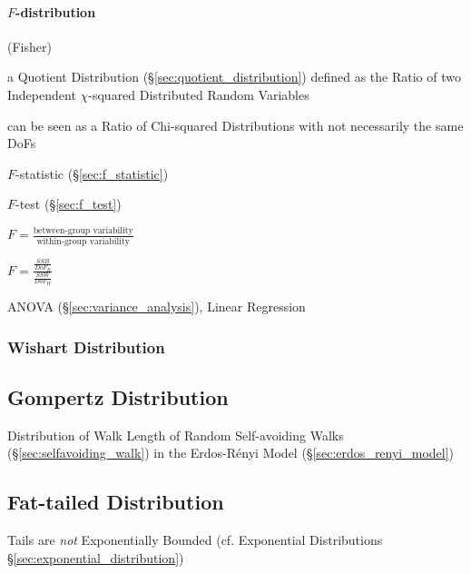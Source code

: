 \paragraph{$F$-distribution}\label{sec:f_distribution}\hfill

(Fisher)

a Quotient Distribution (\S\ref{sec:quotient_distribution}) defined as the Ratio
of two Independent $\chi$-squared Distributed Random Variables

can be seen as a Ratio of Chi-squared Distributions with not necessarily the
same DoFs

$F$-statistic (\S\ref{sec:f_statistic})

$F$-test (\S\ref{sec:f_test})

$F = \frac{\text{between-group variability}}{\text{within-group variability}}$

$F = \frac{\frac{SSB}{DoF_B}}{\frac{SSW}{DoF_W}}$

ANOVA (\S\ref{sec:variance_analysis}), Linear Regression



\subsubsection{Wishart Distribution}\label{sec:wishart_distribution}



\subsection{Gompertz Distribution}\label{sec:gompertz_distribution}

Distribution of Walk Length of Random Self-avoiding Walks
(\S\ref{sec:selfavoiding_walk}) in the Erdos-R\'enyi Model
(\S\ref{sec:erdos_renyi_model})



\subsection{Fat-tailed Distribution}\label{sec:fat_tailed}

Tails are \emph{not} Exponentially Bounded (cf. Exponential Distributions
\S\ref{sec:exponential_distribution})


